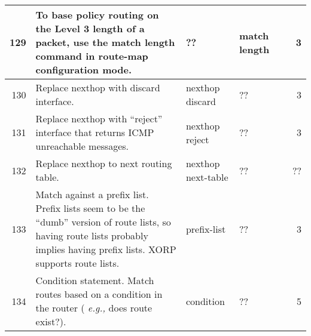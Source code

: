 \documentclass[letterpaper]{article}
\begin{document}
\begin{center}
\begin{supertabular}{|r |p{6cm} |p{2cm} |p{2cm} |p{2cm} |r|}
129 &
To base policy routing on the Level 3 length of a packet, use the match length
command in route-map configuration mode.
& ?? & match length &  & 3 \\
\hline

130 &
Replace nexthop with discard interface.
& nexthop discard & ?? & & 3 \\
\hline

131 &
Replace nexthop with ``reject'' interface that returns ICMP unreachable messages.
& nexthop reject & ?? & & 3 \\
\hline

132 &
Replace nexthop to next routing table.
& nexthop next-table & ?? & & ?? \\
\hline

133 &
Match against a prefix list.  Prefix lists seem to be the ``dumb'' version of
route lists, so having route lists probably implies having prefix lists.  XORP
supports route lists.
& prefix-list & ?? & & 3 \\
\hline

134 &
Condition statement.  Match routes based on a condition in the router ({\em
e.g.,} does route exist?).
& condition & ?? & & 5 \\

\end{supertabular}
\end{center}
\end{document}
